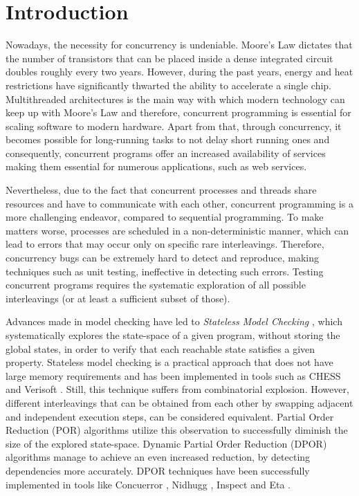  \chapter{Introduction}

Nowadays, the necessity for concurrency is undeniable. 
Moore's Law \cite{4785860} dictates that the number of
transistors that can be placed inside a dense integrated circuit doubles roughly every two years.
However, during the past years, energy and heat restrictions have significantly thwarted the ability 
to accelerate a single chip. Multithreaded architectures
is the main way with which modern technology can keep up with Moore's Law and therefore, concurrent 
programming is essential for scaling software to modern hardware. Apart from that, through concurrency, it becomes possible for 
long-running tasks to not delay short running ones and consequently, concurrent programs offer an increased availability 
of services making them essential for numerous applications, such as web services. 

Nevertheless, due to the fact that concurrent processes and threads share resources and have to communicate with each other,
concurrent programming is a more challenging endeavor, compared to sequential programming. To make matters worse, 
processes are scheduled in a non-deterministic manner, which can lead to errors that may occur only on specific 
rare interleavings. Therefore, concurrency bugs can be extremely hard to detect and reproduce, making techniques such as
unit testing, ineffective in detecting such errors. Testing concurrent programs requires the systematic exploration
of all possible interleavings (or at least a sufficient subset of those).

Advances made in model checking have led to \textit{Stateless Model Checking} \cite{Godefroid:1997:MCP:263699.263717}, 
which systematically explores the state-space of a given program, without storing the global states, in order to verify
that each reachable state satisfies a given property.
Stateless model checking is a practical approach that does not have large memory requirements and has been implemented in
tools such as CHESS \cite{Musuvathi:2008:FRH:1855741.1855760} and Verisoft \cite{Godefroid:2005:SMC:1084665.1084674}.
Still, this technique suffers from combinatorial explosion. However, different interleavings that can be obtained from each other by
swapping adjacent and independent execution steps, can be considered equivalent.
Partial Order Reduction (POR) \cite{Godefroid1996, POR, 10.1007/3-540-53863-1_36} algorithms utilize this observation to successfully diminish
the size of the explored state-space. Dynamic Partial Order Reduction 
(DPOR) \cite{FlanaganDPOR, AbdullaAronisJohnssonSagonasDPOR2014} algorithms manage to achieve an even increased reduction,
by detecting dependencies more accurately. DPOR techniques have been successfully implemented in tools like Concuerror 
\cite{6569727, Gotovos:2011:TDC:2034654.2034664}, Nidhugg \cite{Abdulla:2015:SMC:2945565.2945622}, Inspect \cite{yang2008inspect}
and Eta \cite{simsa2011efficient}.

